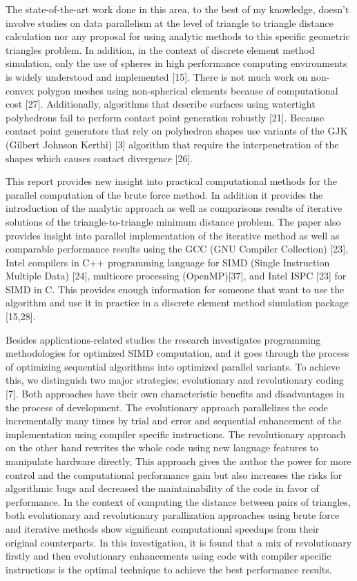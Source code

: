 \documentclass[times,12pt]{ACME2015article}
\begin{document}
The state-of-the-art work done in this area, to the best of my knowledge, doesn't involve studies on data parallelism at the level of triangle to triangle distance calculation nor any proposal for using analytic methods to this specific geometric triangles problem. In addition, in the context of discrete element method simulation, only the use of spheres in high performance computing environments is widely understood and implemented [15]. There is not much work on non-convex polygon meshes using non-spherical elements because of computational cost [27]. Additionally, algorithms that describe surfaces using watertight polyhedrons fail to perform contact point generation robustly [21]. Because contact point generators that rely on polyhedron shapes use variants of the GJK (Gilbert Johnson Kerthi) [3] algorithm that require the interpenetration of the shapes which causes contact divergence [26].

This report provides new insight into practical computational methods for the parallel computation of the brute force method. In addition it provides the introduction of the analytic approach as well as comparisons results of iterative solutions of the triangle-to-triangle minimum distance problem. The paper also provides insight into parallel implementation of the iterative method as well as comparable performance results using the GCC (GNU Compiler Collection) [23], Intel compilers in C++ programming language for SIMD (Single Instruction Multiple Data) [24], multicore processing (OpenMP)[37], and Intel ISPC  [23] for SIMD in C. This provides enough information for someone that want to use the algorithm and use it in practice in a discrete element method simulation package [15,28].

Besides applications-related studies the research investigates programming methodologies for optimized SIMD computation, and it goes through the process of optimizing sequential algorithms into optimized parallel variants. To achieve this, we distinguish two major strategies; evolutionary and revolutionary coding [7]. Both approaches have their own characteristic benefits and disadvantages in the process of development. The evolutionary approach parallelizes the code incrementally many times by trial and error and sequential enhancement of the implementation using compiler specific instructions. The revolutionary approach on the other hand rewrites the whole code using new language features to manipulate hardware directly, This approach gives the author the power for more control and the computational performance gain but also increases the risks for algorithmic bugs and decreased the maintainability of the code in favor of performance. In the context of computing the distance between pairs of triangles, both evolutionary and revolutionary parallization approaches using brute force and iterative methods show significant computational speedups from their original counterparts. In this investigation, it is found that a mix of revolutionary firstly and then evolutionary enhancements using code with compiler specific instructions is the optimal technique to achieve the best performance results.
\end{document}
